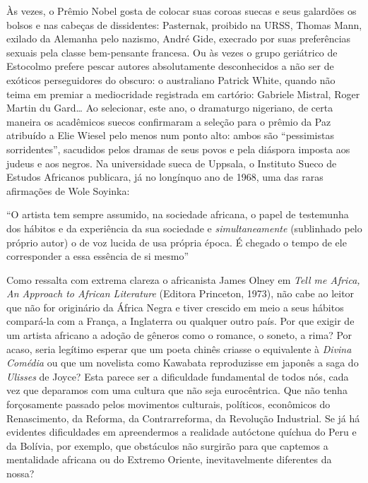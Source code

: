 \documentclass[
  letterpaper,
  DIV=11,
  numbers=noendperiod]{scrreprt}
\begin{document}
Às vezes, o Prêmio Nobel gosta de colocar suas coroas suecas e seus
galardões os bolsos e nas cabeças de dissidentes: Pasternak, proibido na
URSS, Thomas Mann, exilado da Alemanha pelo nazismo, André Gide,
execrado por suas preferências sexuais pela classe bem-pensante
francesa. Ou às vezes o grupo geriátrico de Estocolmo prefere pescar
autores absolutamente desconhecidos a não ser de exóticos perseguidores
do obscuro: o australiano Patrick White, quando não teima em premiar a
mediocridade registrada em cartório: Gabriele Mistral, Roger Martin du
Gard\ldots{} Ao selecionar, este ano, o dramaturgo nigeriano, de certa
maneira os acadêmicos suecos confirmaram a seleção para o prêmio da Paz
atribuído a Elie Wiesel pelo menos num ponto alto: ambos são
``pessimistas sorridentes'', sacudidos pelos dramas de seus povos e pela
diáspora imposta aos judeus e aos negros. Na universidade sueca de
Uppsala, o Instituto Sueco de Estudos Africanos publicara, já no
longínquo ano de 1968, uma das raras afirmações de Wole Soyinka:

``O artista tem sempre assumido, na sociedade africana, o papel de
testemunha dos hábitos e da experiência da sua sociedade e
\emph{simultaneamente} (sublinhado pelo próprio autor) o de voz lucida
de usa própria época. É chegado o tempo de ele corresponder a essa
essência de si mesmo''

Como ressalta com extrema clareza o africanista James Olney em
\emph{Tell me Africa, An Approach to African Literature} (Editora
Princeton, 1973), não cabe ao leitor que não for originário da África
Negra e tiver crescido em meio a seus hábitos compará-la com a França, a
Inglaterra ou qualquer outro país. Por que exigir de um artista africano
a adoção de gêneros como o romance, o soneto, a rima? Por acaso, seria
legítimo esperar que um poeta chinês criasse o equivalente à
\emph{Divina Comédia} ou que um novelista como Kawabata reproduzisse em
japonês a saga do \emph{Ulisses} de Joyce? Esta parece ser a dificuldade
fundamental de todos nós, cada vez que deparamos com uma cultura que não
seja eurocêntrica. Que não tenha forçosamente passado pelos movimentos
culturais, políticos, econômicos do Renascimento, da Reforma, da
Contrarreforma, da Revolução Industrial. Se já há evidentes dificuldades
em apreendermos a realidade autóctone quíchua do Peru e da Bolívia, por
exemplo, que obstáculos não surgirão para que captemos a mentalidade
africana ou do Extremo Oriente, inevitavelmente diferentes da nossa?
\end{document}
